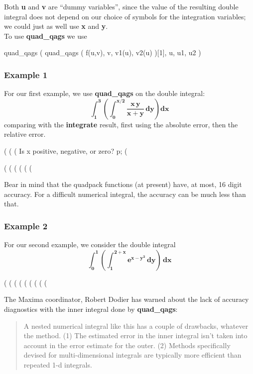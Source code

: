 \documentclass[12pt]{article}
\begin{document}
\noindent Both \textbf{u} and \textbf{v} are ``dummy variables'', since the value of the
  resulting double integral does not depend on our choice of symbols for
  the integration variables; we could just as well use \textbf{x} and \textbf{y}.\\
  
\noindent To use \textbf{quad\_qags} we use
\begin{myVerbatim2}
   quad_qags ( quad_qags ( f(u,v), v, v1(u), v2(u) )[1], u, u1, u2 )
\end{myVerbatim2}
\subsubsection*{Example 1}
For our first example, we use \textbf{quad\_qags} on the double integral:
\begin{equation}
\mathbf{\int_{1}^{3} \left( \int_{0}^{x/2} \frac{x\,y}{x+y} \, dy \right) dx }
\end{equation}
comparing with the \textbf{integrate} result,
  first using the absolute error, then the relative error. 
\begin{myVerbatim}
(%
(%
(%
Is  x  positive, negative, or zero?
p;
(%
\end{myVerbatim}
\newpage
\begin{myVerbatim}
(%
(%
(%
(%
(%
(%
\end{myVerbatim}
Bear in mind that the quadpack functions (at present) have, at most, 16 digit accuracy.
For a difficult numerical integral, the accuracy can be much less than that.
\subsubsection*{Example 2}
For our second example, we consider the double integral
\begin{equation}
\mathbf{\int_{0}^{1} \left( \int_{1}^{2+x} e^{x - y^{2}}\, dy \right) \, dx }
\end{equation}  
\begin{myVerbatim}
(%
(%
(%
(%
(%
(%
(%
(%
(%
\end{myVerbatim} 
The Maxima coordinator, Robert Dodier has warned about the 
 lack of accuracy diagnostics with the inner integral done 
 by \textbf{quad\_qags}:
\begin{quote}
A nested numerical integral like this has a couple of drawbacks,
whatever the method. (1) The estimated error in the inner integral
isn't taken into account in the error estimate for the outer.
(2) Methods specifically devised for multi-dimensional integrals
are typically more efficient than repeated 1-d integrals.
\end{quote}
\end{document}
